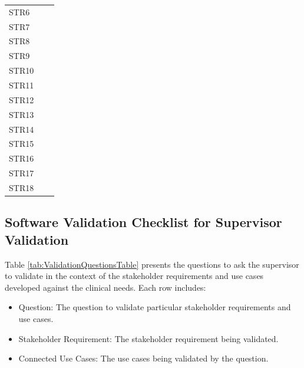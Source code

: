 \documentclass[10pt,titlepage]{article}
\begin{document}
\begin{longtable}{@{}>{\raggedright\arraybackslash}p{} >{\raggedright\arraybackslash}p{} >{\raggedright\arraybackslash}p{}@{}}
STR6
& 
& \\

STR7
& 
& \\

STR8
& 
& \\

STR9
& 
& \\

STR10
& 
& \\

STR11
& 
& \\

STR12
& 
& \\

STR13
& 
& \\

STR14
& 
& \\

STR15
& 
& \\

STR16
& 
& \\

STR17
& 
& \\

STR18
& 
& \\

\end{longtable}

\subsection{Software Validation Checklist for Supervisor Validation}\label{sec:ValidationQuestions}

Table \ref{tab:ValidationQuestionsTable} presents the questions to ask the supervisor to validate \progname{} in the context of the stakeholder requirements and 
use cases developed against the clinical needs. Each row includes:
\begin{itemize}
  \item Question: The question to validate particular stakeholder requirements and use cases.
  \item Stakeholder Requirement: The stakeholder requirement being validated.
  \item Connected Use Cases: The use cases being validated by the question.
\end{itemize}
\end{document}
